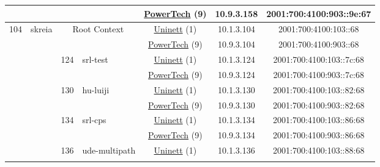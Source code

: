 \begin{small}
\begin{center}
\begin{longtable}{|c|c|c|c|c|c|c|c|}
  &  &  &  & \multicolumn{2}{|c|}{\tiny{\href{http://www.powertech.no}{PowerTech} (9)}} & \tiny{10.9.3.158} & \tiny{2001:700:4100:903::9e:67} \\ \hline
 \multirow{22}{*}{\tiny{104}} & \multicolumn{1}{|l|}{\multirow{22}{*}{\tiny{skreia}}} & \multicolumn{2}{|c|}{\multirow{2}{*}{\tiny{Root Context}}} & \multicolumn{2}{|c|}{\tiny{\href{https://www.uninett.no}{Uninett} (1)}} & \tiny{10.1.3.104} & \tiny{2001:700:4100:103::68} \\* \cline{5-5}\cline{6-6}\cline{7-7}\cline{8-8}
  &  & \multicolumn{2}{|c|}{} & \multicolumn{2}{|c|}{\tiny{\href{http://www.powertech.no}{PowerTech} (9)}} & \tiny{10.9.3.104} & \tiny{2001:700:4100:903::68} \\* \cline{3-3}\cline{4-4}\cline{5-5}\cline{6-6}\cline{7-7}\cline{8-8}
  &  & \multirow{2}{*}{\tiny{124}} & \multicolumn{1}{|l|}{\multirow{2}{*}{\tiny{srl-test}}} & \multicolumn{2}{|c|}{\tiny{\href{https://www.uninett.no}{Uninett} (1)}} & \tiny{10.1.3.124} & \tiny{2001:700:4100:103::7c:68} \\* \cline{5-5}\cline{6-6}\cline{7-7}\cline{8-8}
  &  &  &  & \multicolumn{2}{|c|}{\tiny{\href{http://www.powertech.no}{PowerTech} (9)}} & \tiny{10.9.3.124} & \tiny{2001:700:4100:903::7c:68} \\* \cline{3-3}\cline{4-4}\cline{5-5}\cline{6-6}\cline{7-7}\cline{8-8}
  &  & \multirow{2}{*}{\tiny{130}} & \multicolumn{1}{|l|}{\multirow{2}{*}{\tiny{hu-luiji}}} & \multicolumn{2}{|c|}{\tiny{\href{https://www.uninett.no}{Uninett} (1)}} & \tiny{10.1.3.130} & \tiny{2001:700:4100:103::82:68} \\* \cline{5-5}\cline{6-6}\cline{7-7}\cline{8-8}
  &  &  &  & \multicolumn{2}{|c|}{\tiny{\href{http://www.powertech.no}{PowerTech} (9)}} & \tiny{10.9.3.130} & \tiny{2001:700:4100:903::82:68} \\* \cline{3-3}\cline{4-4}\cline{5-5}\cline{6-6}\cline{7-7}\cline{8-8}
  &  & \multirow{2}{*}{\tiny{134}} & \multicolumn{1}{|l|}{\multirow{2}{*}{\tiny{srl-cps}}} & \multicolumn{2}{|c|}{\tiny{\href{https://www.uninett.no}{Uninett} (1)}} & \tiny{10.1.3.134} & \tiny{2001:700:4100:103::86:68} \\* \cline{5-5}\cline{6-6}\cline{7-7}\cline{8-8}
  &  &  &  & \multicolumn{2}{|c|}{\tiny{\href{http://www.powertech.no}{PowerTech} (9)}} & \tiny{10.9.3.134} & \tiny{2001:700:4100:903::86:68} \\* \cline{3-3}\cline{4-4}\cline{5-5}\cline{6-6}\cline{7-7}\cline{8-8}
  &  & \multirow{2}{*}{\tiny{136}} & \multicolumn{1}{|l|}{\multirow{2}{*}{\tiny{ude-multipath}}} & \multicolumn{2}{|c|}{\tiny{\href{https://www.uninett.no}{Uninett} (1)}} & \tiny{10.1.3.136} & \tiny{2001:700:4100:103::88:68} \\* \cline{5-5}\cline{6-6}\cline{7-7}\cline{8-8}

\end{longtable}
\end{center}
\end{small}
